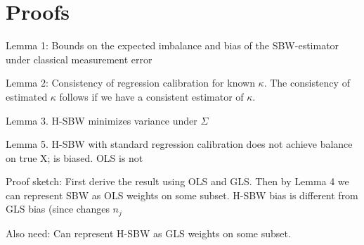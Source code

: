 \section{Proofs}

Lemma 1: Bounds on the expected imbalance and bias of the SBW-estimator under classical measurement error 

Lemma 2: Consistency of regression calibration for known $\kappa$. The consistency of estimated $\kappa$ follows if we have a consistent estimator of $\kappa$.

Lemma 3. H-SBW minimizes variance under $\Sigma$


Lemma 5. H-SBW with standard regression calibration does not achieve balance on true X; is biased. OLS is not

Proof sketch: First derive the result using OLS and GLS. Then by Lemma 4 we can represent SBW as OLS weights on some subset. H-SBW bias is different from GLS bias (since changes $n_j$

Also need: Can represent H-SBW as GLS weights on some subset.